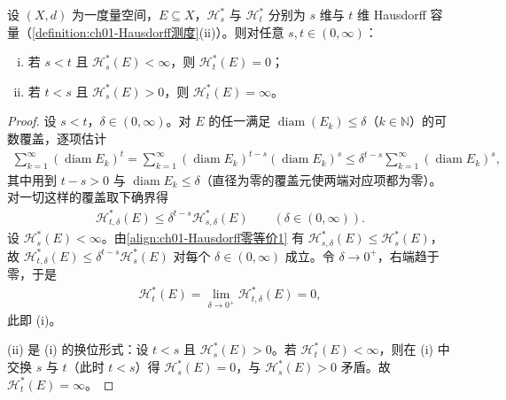 \documentclass[../../main.tex]{subfiles}%
\begin{document}
\begin{lemma}\label{lemma:ch01-Hausdorff维数二分}
设 $(X,d)$ 为一度量空间，$E\subseteq X$，$\mathcal{H}_s^*$ 与 $\mathcal{H}_t^*$ 分别为 $s$ 维与 $t$ 维 Hausdorff 容量（\cref{definition:ch01-Hausdorff测度}(ii)）。则对任意 $s,t\in(0,\infty)$：
\begin{enumerate}[(i)]
\item 若 $s<t$ 且 $\mathcal{H}_s^*(E)<\infty$，则 $\mathcal{H}_t^*(E)=0$；
\item 若 $t<s$ 且 $\mathcal{H}_s^*(E)>0$，则 $\mathcal{H}_t^*(E)=\infty$。
\end{enumerate}
\end{lemma}

\begin{proof}
设 $s<t$，$\delta\in(0,\infty)$。对 $E$ 的任一满足 $\operatorname{diam}(E_k)\leqslant\delta$（$k\in\mathbb{N}$）的可数覆盖，逐项估计
\begin{align*}
\sum_{k=1}^\infty(\operatorname{diam}E_k)^t=\sum_{k=1}^\infty(\operatorname{diam}E_k)^{t-s}(\operatorname{diam}E_k)^s\leqslant\delta^{t-s}\sum_{k=1}^\infty(\operatorname{diam}E_k)^s,
\end{align*}
其中用到 $t-s>0$ 与 $\operatorname{diam}E_k\leqslant\delta$（直径为零的覆盖元使两端对应项都为零）。对一切这样的覆盖取下确界得
\begin{align*}
\mathcal{H}_{t,\delta}^*(E)\leqslant\delta^{t-s}\mathcal{H}_{s,\delta}^*(E)\qquad(\delta\in(0,\infty)).
\end{align*}
设 $\mathcal{H}_s^*(E)<\infty$。由\eqref{align:ch01-Hausdorff零等价1} 有 $\mathcal{H}_{s,\delta}^*(E)\leqslant\mathcal{H}_s^*(E)$，故 $\mathcal{H}_{t,\delta}^*(E)\leqslant\delta^{t-s}\mathcal{H}_s^*(E)$ 对每个 $\delta\in(0,\infty)$ 成立。令 $\delta\to0^+$，右端趋于零，于是
\begin{align*}
\mathcal{H}_t^*(E)=\lim_{\delta\to0^+}\mathcal{H}_{t,\delta}^*(E)=0,
\end{align*}
此即 (i)。

(ii) 是 (i) 的换位形式：设 $t<s$ 且 $\mathcal{H}_s^*(E)>0$。若 $\mathcal{H}_t^*(E)<\infty$，则在 (i) 中交换 $s$ 与 $t$（此时 $t<s$）得 $\mathcal{H}_s^*(E)=0$，与 $\mathcal{H}_s^*(E)>0$ 矛盾。故 $\mathcal{H}_t^*(E)=\infty$。
\end{proof}
\end{document}
